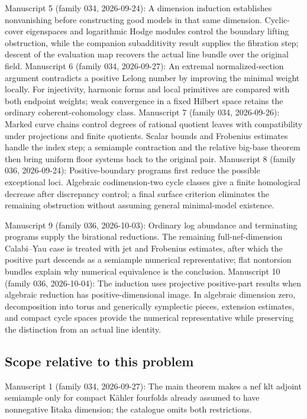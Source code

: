 \documentclass[11pt]{article}
\begin{document}
Manuscript 5 (family 034, 2026-09-24): A dimension induction establishes nonvanishing before constructing good models in that same dimension. Cyclic-cover eigenspaces and logarithmic Hodge modules control the boundary lifting obstruction, while the companion subadditivity result supplies the fibration step; descent of the evaluation map recovers the actual line bundle over the original field. Manuscript 6 (family 034, 2026-09-27): An extremal normalized-section argument contradicts a positive Lelong number by improving the minimal weight locally. For injectivity, harmonic forms and local primitives are compared with both endpoint weights; weak convergence in a fixed Hilbert space retains the ordinary coherent-cohomology class. Manuscript 7 (family 034, 2026-09-26): Marked curve chains control degrees of rational quotient leaves with compatibility under projections and finite quotients. Scalar bounds and Frobenius estimates handle the index step; a semiample contraction and the relative big-base theorem then bring uniform floor systems back to the original pair. Manuscript 8 (family 036, 2026-09-24): Positive-boundary programs first reduce the possible exceptional loci. Algebraic codimension-two cycle classes give a finite homological decrease after discrepancy control; a final surface criterion eliminates the remaining obstruction without assuming general minimal-model existence.

Manuscript 9 (family 036, 2026-10-03): Ordinary log abundance and terminating programs supply the birational reductions. The remaining full-nef-dimension Calabi--Yau case is treated with jet and Frobenius estimates, after which the positive part descends as a semiample numerical representative; flat nontorsion bundles explain why numerical equivalence is the conclusion. Manuscript 10 (family 036, 2026-10-04): The induction uses projective positive-part results when algebraic reduction has positive-dimensional image. In algebraic dimension zero, decomposition into torus and generically symplectic pieces, extension estimates, and compact cycle spaces provide the numerical representative while preserving the distinction from an actual line identity.

\subsection{Scope relative to this problem}
Manuscript 1 (family 034, 2026-09-27): The main theorem makes a nef klt adjoint semiample only for compact Kähler fourfolds already assumed to have nonnegative Iitaka dimension; the catalogue omits both restrictions.
\end{document}
